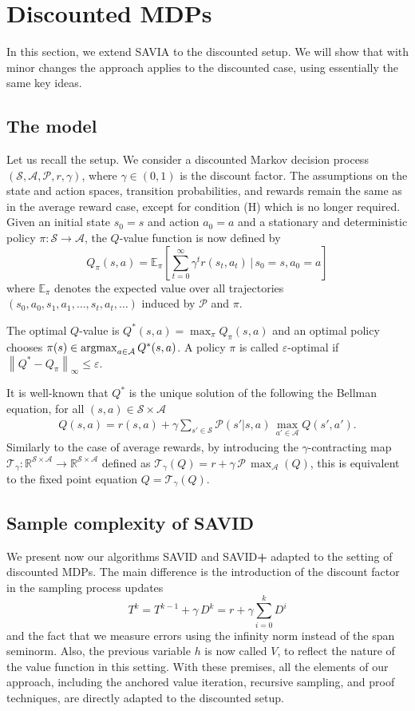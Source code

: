 \documentclass{article}
\newcommand{\Argmax}{\mathop{\rm argmax}}
\newcommand{\cA}{\mathcal{A}}
\newcommand{\cS}{\mathcal{S}}
\newcommand{\cP}{\mathcal{P} }
\newcommand{\expec}{\mathbb{E}}
\newcommand{\T}{\mathcal{T}}
\newcommand{\reals}{\mathbb{R}}
\newcommand*{\infn}[1]{\left\|{#1}\right\|_{\infty}}
\newcommand{\maxA}{\mbox{$\max_\cA$}}
\newcommand{\R}{r}
\theoremstyle{plain}
\theoremstyle{definition}
\theoremstyle{remark}
\begin{document}
\section{Discounted MDPs}
In this section, we extend {\rm SAVIA} to the discounted setup. We will show that with minor changes the approach applies to the discounted case, using essentially  the same key ideas. 
 
\subsection{The model}
Let us recall the setup. We consider a discounted Markov decision process 
$(\cS, \cA, \cP, r, \gamma)$, where $\gamma \in (0,1)$ is the discount factor. The assumptions on the state and action spaces, transition probabilities, and rewards remain the same as in the average reward case, except for condition (H) which is no longer required. Given an initial state $s_0=s$ and action $a_0=a$ and a stationary and deterministic policy $\pi\colon \cS \rightarrow \cA$, the $Q$-value function is now defined by
$$Q_{\pi}(s, a)=\expec_{\pi}[\mbox{$\sum^{\infty}_{t=0}$} \gamma^t r(s_t, a_t) \,|\, s_0=s, a_0=a]$$
 where $\expec_{\pi}$ denotes the expected value over all trajectories $(s_0, a_0, s_1, a_1, \dots, s_{t}, a_{t},\dots)$ induced by $\cP$ and $\pi$.
 
The optimal $Q$-value is $Q^{*}(s,a)=\max_{\pi}Q_{\pi}(s,a)$ and 
an optimal policy chooses $\pi(s)\in\Argmax_{a\in\cA}Q^*(s,a)$. A policy $\pi$ is called $\varepsilon$-optimal  if  $ \infn{Q^*-Q_{\pi}} \le \varepsilon$. 

It is well-known that $Q^*$ is the unique solution of the following the Bellman equation, for all $(s,a)\in\cS\times\cA$
\begin{align*}
Q(s,a)=\R(s,a)+\gamma \sum_{s'\in\cS}\cP(s'|s,a)\,\max_{a'\in\cA}Q(s',a').
\end{align*}
Similarly to the  case of average rewards, by
introducing the $\gamma$-contracting map
$\T_\gamma:\reals^{\cS\times\cA}\to \reals^{\cS\times\cA}$   defined as $\T_\gamma(Q)=\R+\gamma \,\cP\,\maxA(Q)$, 
this is  equivalent to the fixed point equation
$Q=\T_\gamma(Q)$. 

\subsection{Sample complexity of {\rm SAVID}}\label{Se:complexity1-d}

We present now our algorithms {\rm SAVID} and {\rm SAVID\textbf{+}} adapted to the setting of discounted MDPs. The main difference is the introduction of the discount factor in the  sampling process updates
\begin{equation*}
    \mbox{$T^k=T^{k-1}+\gamma\, D^k=\R+\gamma\sum_{i=0}^k D^i$}
\end{equation*}
and the fact that we measure errors using the infinity norm instead of the span seminorm. Also, the previous variable $h$ is now called $V$, to reflect the nature of the value function in this setting. With these premises, all the elements of our approach,  including the anchored value iteration, recursive sampling, and proof techniques, are directly adapted to the discounted setup.
\end{document}
